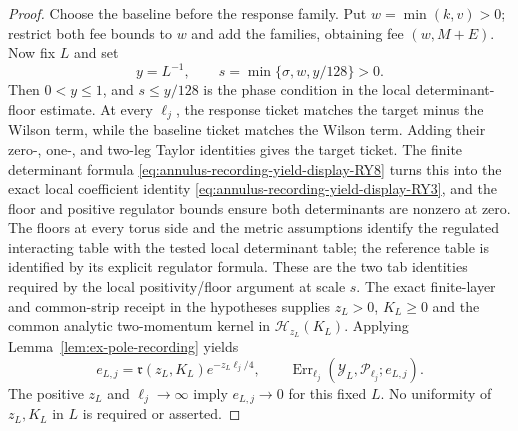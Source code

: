 \begin{proof}
Choose the baseline before the response family. Put $w=\min(k,v)>0$;
restrict both fee bounds to $w$ and add the families, obtaining fee
$(w,M+E)$. Now fix $L$ and set
\begin{equation}
 y=L^{-1},\qquad
 s=\min\{\sigma,w,y/128\}>0.
 \label{eq:annulus-recording-yield-display-RY5}
\end{equation}
Then $0<y\leq1$, and $s\leq y/128$ is the phase condition in the local
determinant-floor estimate. At every $\ell_j$, the response ticket matches
the target minus the Wilson term, while the baseline ticket matches the
Wilson term. Adding their zero-, one-, and two-leg Taylor identities gives
the target ticket. The finite determinant formula \eqref{eq:annulus-recording-yield-display-RY8} turns this into
the exact local coefficient identity \eqref{eq:annulus-recording-yield-display-RY3}, and the floor and positive
regulator bounds ensure both determinants are nonzero at zero. The
floors at every torus side and the metric assumptions identify the
regulated interacting table
with the tested local determinant table; the reference table is identified
by its explicit regulator formula. These are the two tab identities
required by the local positivity/floor argument at scale $s$. The exact
finite-layer and common-strip receipt in the hypotheses supplies
$z_L>0$, $K_L\geq0$ and the common analytic two-momentum kernel in
$\mathcal H_{z_L}(K_L)$. Applying
Lemma~\ref{lem:ex-pole-recording} yields
\begin{equation}
 e_{L,j}=\mathfrak r(z_L,K_L)e^{-z_L\ell_j/4},\qquad
 \operatorname{Err}_{\ell_j}(\mathcal Y_L,\mathcal P_{\ell_j};e_{L,j}).
 \label{eq:annulus-recording-yield-display-RY12}
\end{equation}
The positive $z_L$ and $\ell_j\to\infty$ imply $e_{L,j}\to0$ for this
fixed $L$. No uniformity of $z_L,K_L$ in $L$ is required or asserted.


\end{proof}
